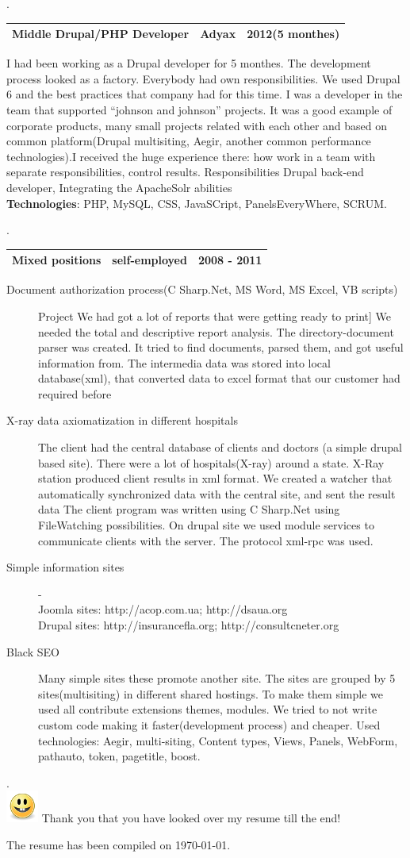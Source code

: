 \documentclass[11pt]{article}
\newcommand{\companyheader}[3]{
	. \\[10mm]
	\begin{tabularx}{\textwidth}{|X|l|r|}
		\hline
			{#1} & \bfseries{#2} & {#3} \\
		\hline
	\end{tabularx}
}
\begin{document}
 		\companyheader{Middle Drupal/PHP Developer}{Adyax}{2012(5 monthes)}
		I had been working as a Drupal developer for 5 monthes. The development process looked as a factory. Everybody had own responsibilities. We used Drupal 6 and the best practices that company had for this time. I was a developer in the team that supported “johnson and johnson” projects. It was a good example of corporate products, many small projects related with each other and based on common platform(Drupal multisiting, Aegir, another common performance technologies).I received the huge experience there: how
work in a team with separate responsibilities, control results. Responsibilities Drupal back-end developer, Integrating the ApacheSolr abilities \\
\textbf{Technologies}: PHP, MySQL, CSS, JavaSCript, PanelsEveryWhere, SCRUM.
 		\companyheader{Mixed positions}{self-employed}{2008 - 2011}
 		\begin{description}
 			\item[Document authorization process(C Sharp.Net, MS Word, MS Excel, VB scripts)] Project We had got a lot of reports that were getting ready to print] We needed the total and descriptive report analysis. The directory-document parser was created. It tried to find documents, parsed them, and got useful information
from. The intermedia data was stored into local database(xml), that converted data
to excel format that our customer had required before
			\item[X-ray data axiomatization in different hospitals] The client had the central database of clients and doctors (a simple drupal based site). There were a lot of hospitals(X-ray) around a state. X-Ray station produced client results in xml format. We created a watcher that automatically synchronized data with the central site, and sent the result data The client program was written using C Sharp.Net using FileWatching possibilities. On drupal site we used module services to communicate clients with the server. The protocol xml-rpc was used.
			\item[Simple information sites] - \\
				Joomla sites: http://acop.com.ua; http://dsaua.org \\
				Drupal sites: http://insurancefla.org; http://consultcneter.org \\

			\item[Black SEO] Many simple sites these promote another site. The sites are grouped by 5 sites(multisiting) in different shared hostings. To make them simple we used all contribute extensions themes, modules. We tried to not write custom code making it faster(development process) and cheaper. Used technologies: Aegir, multi-siting, Content types, Views, Panels, WebForm, pathauto, token, pagetitle, boost.
 		\end{description}
		
		. \\ [10mm]
		\includegraphics[scale=1]{./smile.png} Thank you that you have looked over my resume till the end!
		\begin{center}
			The resume has been compiled on \today .
		\end{center}
\end{document}
